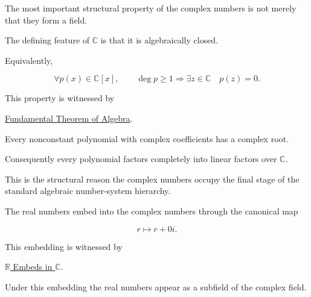 
\begin{remark*}

The most important structural property of the complex numbers is not merely
that they form a field.

The defining feature of $\mathbb C$ is that it is algebraically closed.

Equivalently,

\[
\forall p(x)\in\mathbb C[x],
\qquad
\deg p \ge 1
\Longrightarrow
\exists z\in\mathbb C
\quad
p(z)=0.
\]

This property is witnessed by

\hyperref[thm:fundamental-theorem-of-algebra]
{Fundamental Theorem of Algebra}.

\end{remark*}

\begin{remark*}[Interpretation]

Every nonconstant polynomial with complex coefficients has a complex root.

Consequently every polynomial factors completely into linear factors over
$\mathbb C$.

This is the structural reason the complex numbers occupy the final stage of the
standard algebraic number-system hierarchy.

\end{remark*}


\begin{remark*}

The real numbers embed into the complex numbers through the canonical map

\[
r
\longmapsto
r+0i.
\]

This embedding is witnessed by

\hyperref[thm:r-embeds-in-c]
{$\mathbb R$ Embeds in $\mathbb C$}.

Under this embedding the real numbers appear as a subfield of the complex
field.

\end{remark*}


